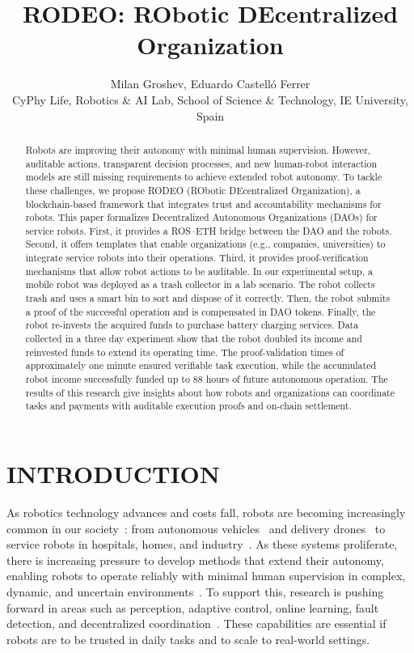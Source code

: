 \documentclass[letterpaper, 10 pt, conference]{ieeeconf}  %
\title{\LARGE \bf RODEO: RObotic DEcentralized Organization}
\author{Milan Groshev, Eduardo Castell{\'{o}} Ferrer\\
\normalsize{CyPhy Life, Robotics \& AI Lab, School of Science \& Technology, IE University, Spain}}
\begin{document}
\maketitle
{}
\thispagestyle{empty}
\pagestyle{empty}

\begin{abstract}
Robots are improving their autonomy with minimal human supervision. However, auditable actions, transparent decision processes, and new human-robot interaction models are still missing requirements to achieve extended robot autonomy. To tackle these challenges, we propose RODEO (RObotic DEcentralized Organization), a blockchain-based framework that integrates trust and accountability mechanisms for robots. This paper formalizes Decentralized Autonomous Organizations (DAOs) for service robots. First, it provides a ROS–ETH bridge between the DAO and the robots. Second, it offers templates that enable organizations (e.g., companies, universities) to integrate service robots into their operations. Third, it provides proof-verification mechanisms that allow robot actions to be auditable. In our experimental setup, a mobile robot was deployed as a trash collector in a lab scenario. The robot collects trash and uses a smart bin to sort and dispose of it correctly. Then, the robot submits a proof of the successful operation and is compensated in DAO tokens. Finally, the robot re-invests the acquired funds to purchase battery charging services. Data collected in a three day experiment show that the robot doubled its income and reinvested funds to extend its operating time. The proof-validation times of approximately one minute ensured verifiable task execution, while the accumulated robot income successfully funded up to 88 hours of future autonomous operation. The results of this research give insights about how robots and organizations can coordinate tasks and payments with auditable execution proofs and on-chain settlement. 
\end{abstract}


\section{INTRODUCTION}

As robotics technology advances and costs fall, robots are becoming increasingly common in our society~\cite{Kusnirakova2025}: from autonomous vehicles~\cite{Badue2021} and delivery drones~\cite{Sorbelli2024} to service robots in hospitals, homes, and industry~\cite{IFR2022}. As these systems proliferate, there is increasing pressure to develop methods that extend their autonomy, enabling robots to operate reliably with minimal human supervision in complex, dynamic, and uncertain environments~\cite{DARPA2017}. To support this, research is pushing forward in areas such as perception, adaptive control, online learning, fault detection, and decentralized coordination~\cite{Bossens2022}. These capabilities are essential if robots are to be trusted in daily tasks and to scale to real-world settings.
\end{document}
